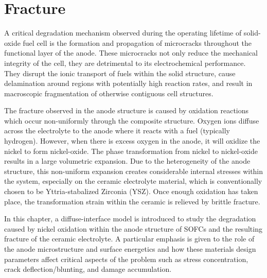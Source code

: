 \chapter{Fracture}

A critical degradation mechanism observed during the operating lifetime of solid-oxide fuel cell is the formation and propagation of microcracks throughout the functional layer of the anode. These microcracks not only reduce the mechanical integrity of the cell, they are detrimental to its electrochemical performance. They disrupt the ionic transport of fuels within the solid structure, cause delamination around regions with potentially high reaction rates, and result in macroscopic fragmentation of otherwise contiguous cell structures.

The fracture observed in the anode structure is caused by oxidation reactions which occur non-uniformly through the composite structure. Oxygen ions diffuse across the electrolyte to the anode where it reacts with a fuel (typically hydrogen). However, when there is excess oxygen in the anode, it will oxidize the nickel to form nickel-oxide. The phase transformation from nickel to nickel-oxide results in a large volumetric expansion. Due to the heterogeneity of the anode structure, this non-uniform expansion creates considerable internal stresses within the system, especially on the ceramic electrolyte material, which is conventionally chosen to be Yttria-stabalized Zirconia (YSZ). Once enough oxidation has taken place, the transformation strain within the ceramic is relieved by brittle fracture.   

In this chapter, a diffuse-interface model is introduced to study the degradation caused by nickel oxidation within the anode structure of SOFCs and the resulting fracture of the ceramic electrolyte. A particular emphasis is given to the role of the anode microstructure and surface energetics and how these materials design parameters affect critical aspects of the problem such as stress concentration, crack deflection/blunting, and damage accumulation. 

\\
\\
\\
\\
